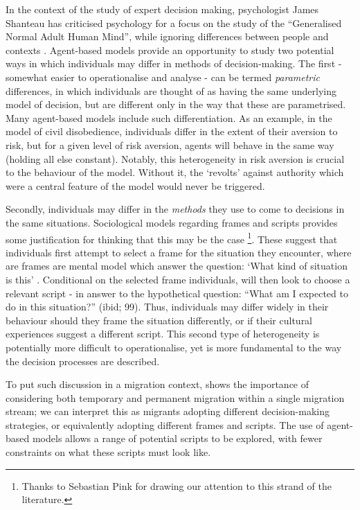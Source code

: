 \documentclass{article}
\begin{document}
In the context of the study of expert decision making, psychologist James Shanteau has criticised psychology for a focus on the study of the ``Generalised Normal Adult Human Mind'', while ignoring differences between people and contexts \citep{Shanteau2015}. Agent-based models provide an opportunity to study two potential ways in which individuals may differ in methods of decision-making. The first - somewhat easier to operationalise and analyse - can be termed \emph{parametric} differences, in which individuals are thought of as having the same underlying model of decision, but are different only in the way that these are parametrised. Many agent-based models include such differentiation. As an example, in the \citet{Epstein2002} model of civil disobedience, individuals differ in the extent of their aversion to risk, but for a given level of risk aversion, agents will behave in the same way (holding all else constant). Notably, this heterogeneity in risk aversion is crucial to the behaviour of the model. Without it, the `revolts' against authority which were a central feature of the model would never be triggered.

Secondly, individuals may differ in the \emph{methods} they use to come to decisions in the same situations. Sociological models regarding frames and scripts provides some justification for thinking that this may be the case \citep{Kronenberg2014}\footnote{Thanks to Sebastian Pink for drawing our attention to this strand of the literature.}. These suggest that individuals first attempt to select a frame for the situation they encounter, where are frames are mental model which answer the question: `What kind of situation is this' . Conditional on the selected frame individuals, will then look to choose a relevant script - in answer to the hypothetical question: ``What am I expected to do in this situation?'' (ibid; 99). Thus, individuals may differ widely in their behaviour should they frame the situation differently, or if their cultural experiences suggest a different script.  This second type of heterogeneity is potentially more difficult to operationalise, yet is more fundamental to the way the decision processes are described.

To put such discussion in a migration context, \cite{Bijwaard2008} shows the importance of considering both temporary and permanent migration within a single migration stream; we can interpret this as migrants adopting different decision-making strategies, or equivalently adopting different frames and scripts. The use of agent-based models allows a range of potential scripts to be explored, with fewer constraints on what these scripts must look like. 
\end{document}
